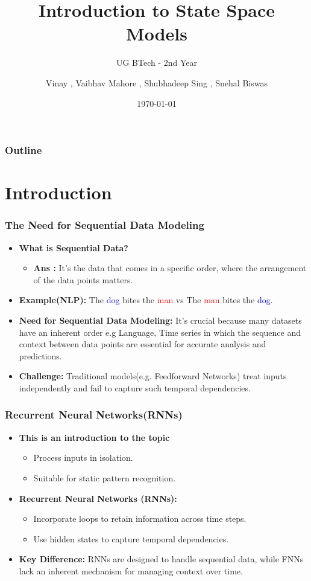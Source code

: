 \documentclass{beamer}
\title{Introduction to State Space Models}
\subtitle{UG BTech - 2nd Year}
\author{Vinay , Vaibhav Mahore , Shubhadeep Sing , Snehal Biswas}
\institute{Indian Institute of Science, Bangalore}
\date{\today}
\begin{document}
\frame{\titlepage}

\begin{frame}
\frametitle{Outline}
\tableofcontents
\end{frame}

\section{Introduction}

\begin{frame}
\frametitle{The Need for Sequential Data Modeling}
\begin{itemize}
    \item \textbf{What is Sequential Data?}   \\
    \begin{itemize}
        \item \textbf{Ans :} It's the  data that comes in a specific order, where the arrangement of the data points matters.
    \end{itemize}
    \item \textbf{Example(NLP):}  
     The \textcolor{blue}{dog} bites the \textcolor{red}{man} vs The \textcolor{red}{man} bites the \textcolor{blue}{dog}.
     \item \textbf{Need for Sequential Data Modeling:}
      It's crucial because many datasets have an inherent order e.g Language, Time series in which the sequence and context between data points are essential for accurate analysis and predictions.
    \item \textbf{Challenge:}  
    Traditional models(e.g. Feedforward Networks) treat inputs independently and fail to capture such temporal dependencies.
\end{itemize}
\end{frame}

\begin{frame}
\frametitle{Recurrent Neural Networks(RNNs)}
\begin{itemize}
    \item \textbf{This is an introduction to the topic}
    \begin{itemize}
        \item Process inputs in isolation.
        \item Suitable for static pattern recognition.
    \end{itemize}
    \item \textbf{Recurrent Neural Networks (RNNs):}
    \begin{itemize}
        \item Incorporate loops to retain information across time steps.
        \item Use hidden states to capture temporal dependencies.
    \end{itemize}
    \item \textbf{Key Difference:}  
    RNNs are designed to handle sequential data, while FNNs lack an inherent mechanism for managing context over time.
\end{itemize}
\end{frame}
\end{document}

